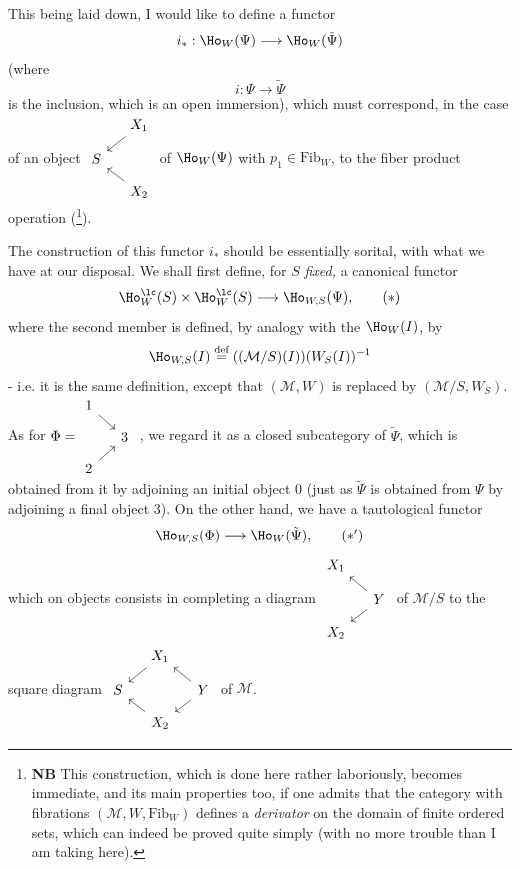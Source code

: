 This being laid down, I would like to define a functor
\[
i_* : \Ho_W(\Psi) \longrightarrow \Ho_W(\tilde{\Psi})
\]
(where
\[
i : \Psi \longrightarrow \tilde{\Psi}
\]
is the inclusion, which is an open immersion), which must correspond, in the case of an object $\vcenter{\hbox{\begin{tikzcd}[ampersand replacement=\&, row sep=small, column sep=small]
 \& X_1 \arrow[dl] \\
S \& \\
 \& X_2 \arrow[ul]
\end{tikzcd}}}$ of $\Ho_W(\Psi)$ with $p_1 \in \mathrm{Fib}_W$, to the fiber product operation (\footnote[131]{\textbf{NB} This construction, which is done here rather laboriously, becomes immediate, and its main properties too, if one admits that the category with fibrations $(\mathcal{M}, W, \mathrm{Fib}_W)$ defines a \textit{derivator} on the domain of finite ordered sets, which can indeed be proved quite simply (with no more trouble than I am taking here).}).


The construction of this functor $i_*$ should be essentially sorital, with what we have at our disposal. We shall first define, for $S$ \textit{fixed,} a canonical functor
\[
\Ho^{\lc}_W(S) \times \Ho^{\lc}_W(S) \longrightarrow \Ho_{W,S}(\Psi), \tag*{$(*)$}
\]
where the second member is defined, by analogy with the $\Ho_W(I)$, by
\[
\Ho_{W,S}(I) \overset{\text{def}}{=} ((\mathcal{M}/S)(I))(W_S(I))^{-1}
\]
- i.e. it is the same definition, except that $(\mathcal{M}, W)$ is replaced by $(\mathcal{M}/S, W_S)$. As for $\Phi = \vcenter{\hbox{\begin{tikzcd}[ampersand replacement=\&, row sep=small, column sep=small]
1 \arrow[dr] \& \\
 \& 3 \\
2 \arrow[ur] \&
\end{tikzcd}}}$ , we regard it as a closed subcategory of $\tilde{\Psi}$, which is obtained from it by adjoining an initial object 0 (just as $\tilde{\Psi}$ is obtained from $\Psi$ by adjoining a final object 3). On the other hand, we have a tautological functor
\[
\Ho_{W,S}(\Phi) \longrightarrow \Ho_W(\tilde{\Psi}), \tag*{$(*')$}
\]
which on objects consists in completing a diagram $\vcenter{\hbox{\begin{tikzcd}[ampersand replacement=\&, row sep=small, column sep=small] %
X_1 \& \\
 \& Y \arrow[ul] \arrow[dl] \\
X_2 \&
\end{tikzcd}}}$ of $\mathcal{M}/S$ to the square diagram $\vcenter{\hbox{\begin{tikzcd}[ampersand replacement=\&, row sep=small, column sep=small]
 \& X_1 \arrow[dl] \& \\
S \& \& Y \arrow[ul] \arrow[dl] \\
 \& X_2 \arrow[ul] \&
\end{tikzcd}}}$ of $\mathcal{M}$.

